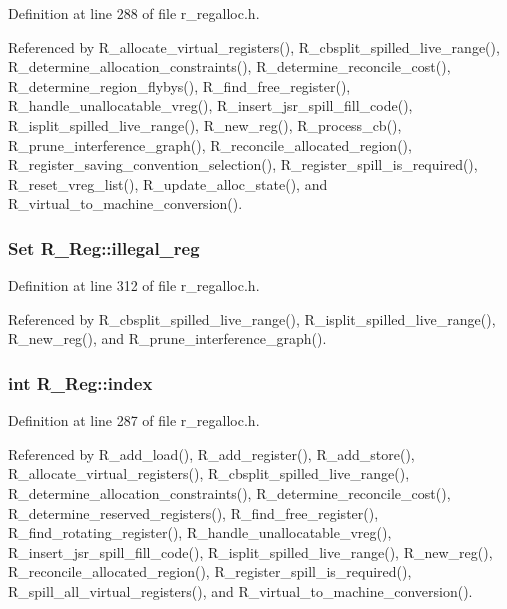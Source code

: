 Definition at line 288 of file r\_\-regalloc.h.

Referenced by R\_\-allocate\_\-virtual\_\-registers(), R\_\-cbsplit\_\-spilled\_\-live\_\-range(), R\_\-determine\_\-allocation\_\-constraints(), R\_\-determine\_\-reconcile\_\-cost(), R\_\-determine\_\-region\_\-flybys(), R\_\-find\_\-free\_\-register(), R\_\-handle\_\-unallocatable\_\-vreg(), R\_\-insert\_\-jsr\_\-spill\_\-fill\_\-code(), R\_\-isplit\_\-spilled\_\-live\_\-range(), R\_\-new\_\-reg(), R\_\-process\_\-cb(), R\_\-prune\_\-interference\_\-graph(), R\_\-reconcile\_\-allocated\_\-region(), R\_\-register\_\-saving\_\-convention\_\-selection(), R\_\-register\_\-spill\_\-is\_\-required(), R\_\-reset\_\-vreg\_\-list(), R\_\-update\_\-alloc\_\-state(), and R\_\-virtual\_\-to\_\-machine\_\-conversion().
\subsubsection{\setlength{\rightskip}{0pt plus 5cm}\bf{Set} \bf{R\_\-Reg::illegal\_\-reg}}\label{structR__Reg_d3e5e48438cee3df69a7d509659c0b68}




Definition at line 312 of file r\_\-regalloc.h.

Referenced by R\_\-cbsplit\_\-spilled\_\-live\_\-range(), R\_\-isplit\_\-spilled\_\-live\_\-range(), R\_\-new\_\-reg(), and R\_\-prune\_\-interference\_\-graph().
\subsubsection{\setlength{\rightskip}{0pt plus 5cm}int \bf{R\_\-Reg::index}}\label{structR__Reg_fd1841724c288ff3f4d3802d52df24ca}




Definition at line 287 of file r\_\-regalloc.h.

Referenced by R\_\-add\_\-load(), R\_\-add\_\-register(), R\_\-add\_\-store(), R\_\-allocate\_\-virtual\_\-registers(), R\_\-cbsplit\_\-spilled\_\-live\_\-range(), R\_\-determine\_\-allocation\_\-constraints(), R\_\-determine\_\-reconcile\_\-cost(), R\_\-determine\_\-reserved\_\-registers(), R\_\-find\_\-free\_\-register(), R\_\-find\_\-rotating\_\-register(), R\_\-handle\_\-unallocatable\_\-vreg(), R\_\-insert\_\-jsr\_\-spill\_\-fill\_\-code(), R\_\-isplit\_\-spilled\_\-live\_\-range(), R\_\-new\_\-reg(), R\_\-reconcile\_\-allocated\_\-region(), R\_\-register\_\-spill\_\-is\_\-required(), R\_\-spill\_\-all\_\-virtual\_\-registers(), and R\_\-virtual\_\-to\_\-machine\_\-conversion().
